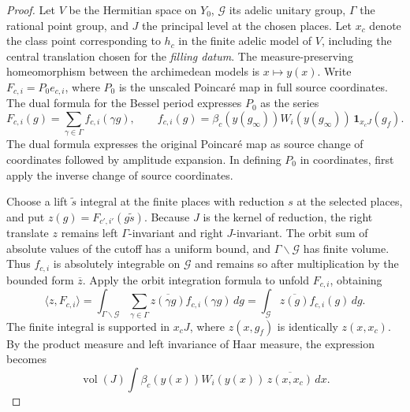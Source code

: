 \begin{proof}
Let $V$ be the Hermitian space on $Y_0$, $\mathcal G$ its adelic unitary group, $\Gamma$ the rational point group, and
$J$ the principal level at the chosen places. Let $x_c$ denote the class point corresponding to $h_c$ in the finite adelic model of $V$,
including the central translation chosen for the \emph{filling datum}. The measure-preserving homeomorphism between the archimedean models is
$x\mapsto y(x)$. Write $F_{c,i}=P_0e_{c,i}$, where $P_0$ is the unscaled Poincaré map in full source coordinates.
The dual formula for the Bessel period expresses $P_0$ as the series
\[
 F_{c,i}(g)=\sum_{\gamma\in\Gamma} f_{c,i}(\gamma g),\qquad
 f_{c,i}(g)
 =\beta_c(y(g_\infty))W_i(y(g_\infty))\,
       \mathbf 1_{x_cJ}(g_f).
\]
The dual formula expresses the original Poincaré map as source change of coordinates followed by amplitude expansion.
In defining $P_0$ in coordinates, first apply the inverse change of source coordinates.

Choose a lift $\widetilde s$ integral at the finite places with reduction $s$ at the selected places, and put $z(g)=F_{c',i'}(g\widetilde s)$.
Because $J$ is the kernel of reduction, the right translate $z$ remains left $\Gamma$-invariant and right $J$-invariant.
The orbit sum of absolute values of the cutoff has a uniform bound, and $\Gamma\backslash\mathcal G$ has finite volume.
Thus $f_{c,i}$ is absolutely integrable on $\mathcal G$ and remains so after multiplication by the bounded form $\overline z$.
Apply the orbit integration formula to unfold $F_{c,i}$, obtaining
\[
 \langle z,F_{c,i}\rangle
 =\int_{\Gamma\backslash\mathcal G}
     \sum_{\gamma\in\Gamma}\overline{z(\gamma g)}f_{c,i}(\gamma g)\,dg
 =\int_{\mathcal G}\overline{z(g)}f_{c,i}(g)\,dg .
\]
The finite integral is supported in $x_cJ$, where $z(x,g_f)$ is identically
$z(x,x_c)$. By the product measure and left invariance of Haar measure, the expression becomes
\[
 \operatorname{vol}(J)\int
    \beta_c(y(x))W_i(y(x))\,\overline{z(x,x_c)}\,dx.
\]


\end{proof}

